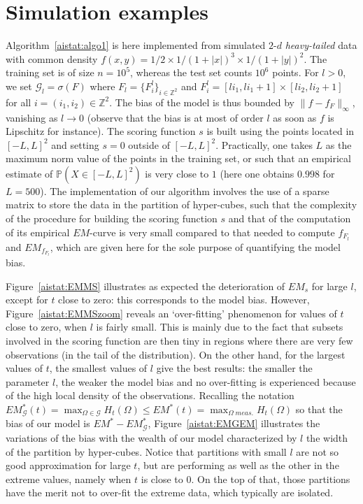 \section{Simulation examples}
\label{aistat:sec:simul}
Algorithm~\ref{aistat:algo1} is here implemented from simulated $2$-$d$ \textit{heavy-tailed} data  with common density
$f(x,y)=1/2 \times 1/(1+|x|)^3\times 1/(1+|y|)^2$. The training set is of size $n=10^5$, whereas the test set counts $10^6$ points.
For $l>0$, we set $\mathcal{G}_l=\sigma(F)$ where $F_l=\{F_i^l\}_{i\in \mathbb{Z}^2}$ and $F_i^l = [l i_1,l i_1+1]\times[l i_2,l i_2+1]$ for all $i=(i_1,i_2) \in \mathbb{Z}^2$. The bias of the model is thus bounded by $\|f-f_{F}\|_{\infty}$, vanishing as $l \rightarrow 0$ (observe that the bias is at most of order $l$ as soon as $f$ is Lipschitz for instance). The scoring function $s$ is built using the points located in $[-L,L]^2$ and setting $s=0$ outside of $[-L,L]^2$. Practically, one takes $L$ as the maximum norm value of the points in the training set, or such that an empirical estimate of $\mathbb{P}(X \in [-L,L]^2)$ is very close to $1$ (here one obtains $0.998$ for $L=500$). 
The implementation of our algorithm involves the use of a sparse matrix to store the data in the partition of hyper-cubes, such that the complexity of the procedure for building the scoring function $s$ and that of the computation of its empirical $EM$-curve is very small compared to that needed to compute $f_{F_l}$ and $EM_{f_{F_l}}$, which are given here for the sole purpose of quantifying the model bias.

Figure~\ref{aistat:EMMS} illustrates as expected the deterioration of $EM_s$ for large $l$, except for $t$ close to zero: this corresponds to the model bias. However, Figure~\ref{aistat:EMMSzoom} reveals an `over-fitting' phenomenon for values of $t$ close to zero, when $l$ is fairly small. 
This is mainly due to the fact that subsets involved in the scoring function are then tiny in regions where there are very few observations (in the tail of the distribution). On the other hand, for the largest values of $t$, the smallest values of $l$ give the best results: the smaller the parameter $l$, the weaker the model bias and no over-fitting is experienced because of the high local density of the observations.
Recalling the notation $EM_{\mathcal{G}}^*(t)=\max_{\Omega \in \mathcal{G}}H_t(\Omega) \le EM^*(t)=\max_{\Omega\; meas.}H_t(\Omega)$ so that the bias of our model is $EM^*-EM^*_{\mathcal{G}}$, Figure~\ref{aistat:EMGEM} illustrates the variations of the bias with the wealth of our model characterized by $l$ the width of the partition by hyper-cubes. Notice that partitions with small $l$ are not so good approximation for large $t$, but are performing as well as the other in the extreme values, namely when $t$ is close to $0$. On the top of that, those partitions have the merit not to over-fit the extreme data, which typically are isolated.
 
